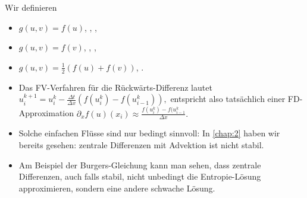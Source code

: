 \begin{df} \label{5.8}
    Wir definieren
    \begin{itemize}
        \item
            $g(u,v) = f(u)$, , ,
        \item
            $g(u,v) = f(v)$, , ,
        \item
            $g(u,v) = \frac{1}{2}(f(u) + f(v))$, .
    \end{itemize}
    \begin{note}
        \begin{itemize}
            \item
                Das FV-Verfahren für die Rückwärts-Differenz lautet
                \begin{math}
                    u_i^{k+1} = u_i^k - \frac{\Delta t}{\Delta x} (f(u_i^k) - f(u_{i-1}^k)),
                \end{math}
                entspricht also tatsächlich einer FD-Approximation
                \begin{math}
                    \partial_x f(u)(x_i) \approx \frac{f(u_i^k) - f(u_{i-1}^k}{\Delta x}.
                \end{math}
            \item
                Solche einfachen Flüsse sind nur bedingt sinnvoll:
                In \ref{chap:2} haben wir bereits gesehen: zentrale Differenzen mit Advektion ist nicht stabil.
            \item
                Am Beispiel der Burgers-Gleichung kann man sehen, dass zentrale Differenzen, auch falls stabil, nicht unbedingt die Entropie-Lösung approximieren, sondern eine andere schwache Lösung.


\end{itemize}
\end{note}
\end{df}
